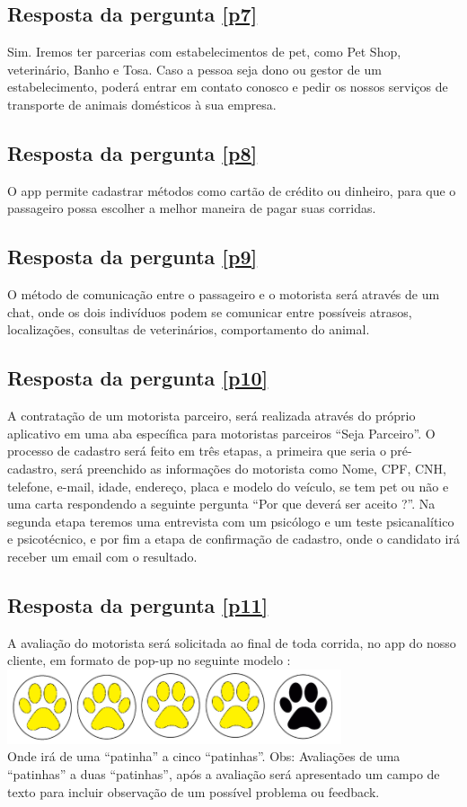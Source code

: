\begin{apendicesenv}
\subsection{Resposta da pergunta \ref{p7}}
Sim. Iremos ter parcerias com estabelecimentos de pet, como Pet Shop, veterinário, Banho e Tosa. Caso a pessoa seja dono ou gestor de um estabelecimento, poderá entrar em contato conosco e pedir os nossos serviços de transporte de animais domésticos à sua empresa.

\subsection{Resposta da pergunta \ref{p8}}
O app permite cadastrar métodos como cartão de crédito ou dinheiro, para que o passageiro possa escolher a melhor maneira de pagar suas corridas.

\subsection{Resposta da pergunta \ref{p9}}
O método de comunicação entre o passageiro e o motorista será através de um chat, onde os dois indivíduos podem se comunicar entre possíveis atrasos, localizações, consultas de veterinários, comportamento do animal.

\subsection{Resposta da pergunta \ref{p10}}
A contratação de um motorista parceiro, será realizada através do próprio aplicativo em uma aba específica para motoristas parceiros “Seja Parceiro”. O processo de cadastro será feito em três etapas, a primeira que seria o pré-cadastro, será preenchido as informações do motorista como Nome, CPF, CNH, telefone, e-mail, idade, endereço, placa e modelo do veículo, se tem pet ou não e uma carta respondendo a seguinte pergunta “Por que deverá ser aceito ?”. Na segunda etapa teremos uma entrevista com um psicólogo e um teste psicanalítico e psicotécnico, e por fim a etapa de confirmação de cadastro, onde o candidato irá receber um email com o resultado.

\subsection{Resposta da pergunta \ref{p11}}
A avaliação do motorista será solicitada ao final de toda corrida, no app do nosso cliente, em formato de pop-up no seguinte modelo : 
\\
    \includegraphics{exemplos/diagramas/star.PNG}
\\
Onde irá de uma “patinha” a cinco “patinhas”.
Obs: Avaliações de uma “patinhas” a duas “patinhas”, após a avaliação será apresentado um campo de texto para incluir observação de um possível problema ou feedback.


\end{apendicesenv}
